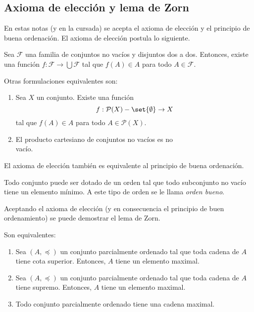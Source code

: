 \subsection{Axioma de elección y lema de Zorn}

En estas notas (y en la cursada) se acepta el axioma de elección y el principio de buena ordenación. El axioma de elección postula lo siguiente.
\begin{custombox}
    Sea $\mathcal{F}$ una familia de conjuntos no vacíos y disjuntos dos a dos. Entonces, existe una función $f: \mathcal{F} \to \bigcup \mathcal{F}$ tal que $f(A) \in A$ para todo $A \in \mathcal{F}$.
\end{custombox}

Otras formulaciones equivalentes son:
\begin{enumerate}[label=(\roman*)]
    \item Sea $X$ un conjunto. Existe una función
    $$f: \mathcal{P}(X) - \set{ \emptyset } \to X$$ 
    tal que $f(A) \in A$ para todo $A \in \mathcal{P}(X)$.   
    \item El producto cartesiano de conjuntos no vacíos es no\\ vacío.
\end{enumerate}

El axioma de elección también es equivalente al principio de buena ordenación.

\begin{custombox}
    Todo conjunto puede ser dotado de un orden tal que todo subconjunto no vacío tiene un elemento mínimo. A este tipo de orden se le llama \textit{orden bueno}.
\end{custombox}

Aceptando el axioma de elección (y en consecuencia el principio de buen ordenamiento) se puede demostrar el lema de Zorn.

\begin{custombox}
    Son equivalentes:
    \begin{enumerate}[label=(\roman*)]
        \item Sea $(A, \preceq)$ un conjunto parcialmente ordenado tal que toda cadena de $A$ tiene cota superior. Entonces, $A$ tiene un elemento maximal.
        \item Sea $(A, \preceq)$ un conjunto parcialmente ordenado tal que toda cadena de $A$ tiene supremo. Entonces, $A$ tiene un elemento maximal.
        \item Todo conjunto parcialmente ordenado tiene una cadena maximal.
    \end{enumerate}
\end{custombox}

